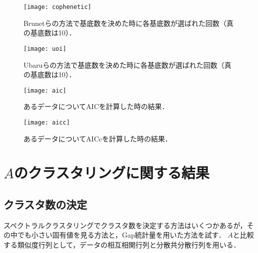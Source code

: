 \begin{figure}[htbp]
    \begin{minipage}{0.5\hsize}
        \begin{center}
            \texttt{[image: cophenetic]}
						\caption{Brunetらの方法で基底数を決めた時に各基底数が選ばれた回数（真の基底数は10）．}
            \label{fig:cophenetic}
        \end{center}
    \end{minipage}
    \begin{minipage}{0.5\hsize}
        \begin{center}
            \texttt{[image: uoi]}
						\caption{Ubaruらの方法で基底数を決めた時に各基底数が選ばれた回数（真の基底数は10）．}
            \label{fig:uoi}
        \end{center}
    \end{minipage}
\end{figure}
\begin{figure}[htbp]
    \begin{minipage}{0.5\hsize}
        \begin{center}
            \texttt{[image: aic]}
						\caption{あるデータについてAICを計算した時の結果．}
            \label{fig:aic}
        \end{center}
    \end{minipage}
    \begin{minipage}{0.5\hsize}
        \begin{center}
						\texttt{[image: aicc]}
						\caption{あるデータについてAICc\cite{Symonds2011}を計算した時の結果．}
            \label{fig:aicc}
        \end{center}
    \end{minipage}
\end{figure}

\subsection{}

\section{$A$のクラスタリングに関する結果}
\subsection{クラスタ数の決定}
スペクトラルクラスタリングでクラスタ数を決定する方法はいくつかあるが，その中でも小さい固有値を見る方法と，Gap統計量を用いた方法を試す．
$A$と比較する類似度行列として，データの相互相関行列と分散共分散行列を用いる．
